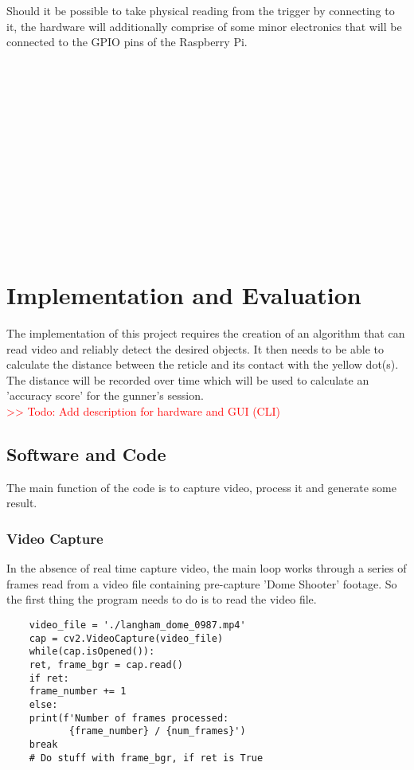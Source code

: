 \documentclass[final]{cmpreport_02}
\begin{document}
Should it be possible to take physical reading from the trigger by connecting to it, the hardware will additionally comprise of some minor electronics that will be connected to the GPIO pins of the Raspberry Pi.


\\\\\\\\\\\\\\\\\\\\\\\\ %

\section{Implementation and Evaluation}

The implementation of this project requires the creation of an algorithm that can read video and reliably detect the desired objects. It then needs to be able to calculate the distance between the reticle and its contact with the yellow dot(s). The distance will be recorded over time which will be used to calculate an 'accuracy score' for the gunner's session.
\\
\textcolor{red}{>> Todo: Add description for hardware and GUI (CLI)}

\subsection{Software and Code}

The main function of the code is to capture video, process it and generate some result.

\subsubsection{Video Capture}

In the absence of real time capture video, the main loop works through a series of frames read from a video file containing pre-capture 'Dome Shooter' footage. So the first thing the program needs to do is to read the video file.

\begin{verbatim}
	video_file = './langham_dome_0987.mp4'
	cap = cv2.VideoCapture(video_file)
	while(cap.isOpened()):
	ret, frame_bgr = cap.read()
	if ret:
	frame_number += 1
	else:
	print(f'Number of frames processed: 
	       {frame_number} / {num_frames}')
	break
	# Do stuff with frame_bgr, if ret is True
\end{verbatim}
\end{document}
